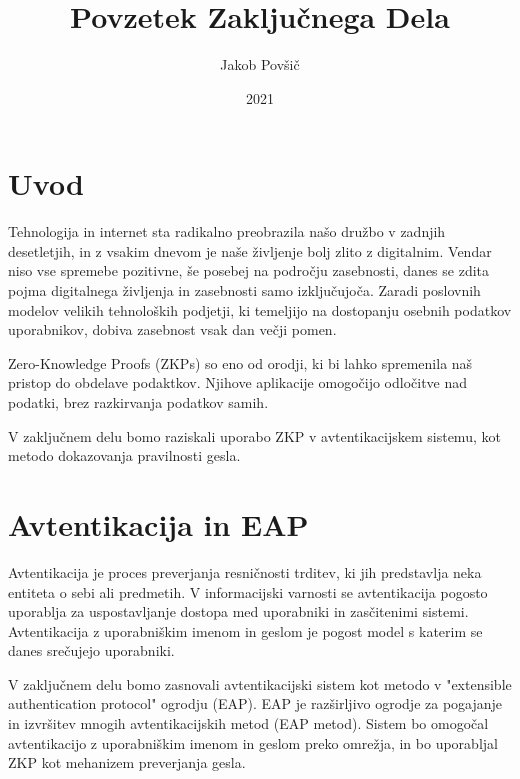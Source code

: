\documentclass[12pt]{article}
\title{Povzetek Zaključnega Dela}
\author{Jakob Povšič}
\date{2021}
\begin{document}
	\maketitle
	

	\section{Uvod}
	Tehnologija in internet sta radikalno preobrazila našo družbo v zadnjih desetletjih, in z vsakim dnevom je naše življenje bolj zlito z digitalnim.
	Vendar niso vse spremebe pozitivne, še posebej na področju zasebnosti, danes se zdita pojma digitalnega življenja in zasebnosti samo izključujoča.
	Zaradi poslovnih modelov velikih tehnoloških podjetji, ki temeljijo na dostopanju osebnih podatkov uporabnikov, dobiva zasebnost vsak dan večji pomen.
	
	Zero-Knowledge Proofs (ZKPs) so eno od orodji, ki bi lahko spremenila naš pristop do obdelave podaktkov.
	Njihove aplikacije omogočijo odločitve nad podatki, brez razkirvanja podatkov samih.
	
	V zaključnem delu bomo raziskali uporabo ZKP v avtentikacijskem sistemu, kot metodo dokazovanja pravilnosti gesla.	
%	
	
	\newpage
	
	\section{Avtentikacija in EAP}
	Avtentikacija je proces preverjanja resničnosti trditev, ki jih predstavlja neka entiteta o sebi ali predmetih.
	V informacijski varnosti se avtentikacija pogosto uporablja za uspostavljanje dostopa med uporabniki in zasčitenimi sistemi.
	Avtentikacija z uporabniškim imenom in geslom je pogost model s katerim se danes srečujejo uporabniki.
	
	V zaključnem delu bomo zasnovali avtentikacijski sistem kot metodo v "extensible authentication protocol" ogrodju (EAP).
	EAP \cite{aboba2004extensible} je razširljivo ogrodje za pogajanje in izvršitev mnogih avtentikacijskih metod (EAP metod).
	Sistem bo omogočal avtentikacijo z uporabniškim imenom in geslom preko omrežja, in bo uporabljal ZKP kot mehanizem preverjanja gesla.
\end{document}
